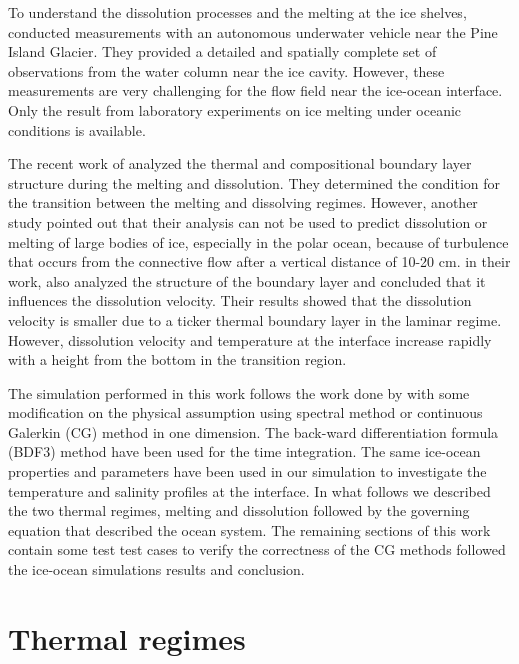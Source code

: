 \documentclass[11pt,a4paper]{article}
\begin{document}
    To understand the dissolution processes and the melting at the ice shelves, \cite{jenkins2010observations} conducted measurements with an autonomous underwater vehicle near the Pine Island Glacier. They provided a detailed and spatially complete set of observations from the water column near the ice cavity. However, these measurements are very challenging for the flow field near the ice-ocean interface. Only the result from laboratory experiments on ice melting under oceanic conditions is available. 
    
    The recent work of \cite{wells2011melting} analyzed the thermal and compositional boundary layer structure during the melting and dissolution. They determined the condition for the transition between the melting and dissolving regimes. However, another study pointed out that their analysis can not be used to predict dissolution or melting of large bodies of ice, especially in the polar ocean, because of turbulence that occurs from the connective flow after a vertical distance of 10-20 cm. \cite{gayen2016simulation} in their work, also analyzed the structure of the boundary layer and concluded that it influences the dissolution velocity. Their results showed that the dissolution velocity is smaller due to a ticker thermal boundary layer in the laminar regime. However, dissolution velocity and temperature at the interface increase rapidly with a height from the bottom in the transition region. 
    
    The simulation performed in this work follows the work done by \cite{gayen2016simulation} with some modification on the physical assumption using spectral method or continuous Galerkin (CG) method in one dimension. The back-ward differentiation formula (BDF3) method have been used for the time integration. The same ice-ocean properties and parameters have been used in our simulation to investigate the temperature and salinity profiles at the interface. In what follows we described the two thermal regimes, melting and dissolution followed by the governing equation that described the ocean system. The remaining sections of this work contain some test test cases to verify the correctness of the CG methods followed the ice-ocean simulations results and conclusion. %
	
	
	\section{Thermal regimes}
	
\end{document}
